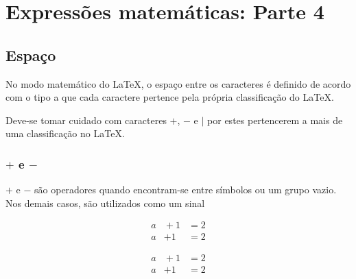 % 
% 
% 
% 
% 
\chapter{Expressões matemáticas: Parte 4} \label{sch:latex:math4}
\section{Espaço}
No modo matemático do LaTeX, o espaço entre os caracteres é definido de acordo com o tipo a que cada caractere pertence pela própria classificação do LaTeX.

Deve-se tomar cuidado com caracteres $+$, $-$ e $|$ por estes pertencerem a mais de uma classificação no LaTeX.

\subsection{$+$ e $-$}
$+$ e $-$ são operadores quando encontram-se entre símbolos ou um grupo vazio. Nos demais casos, são utilizados como um sinal \\
\begin{minipage}[t]{0.47\linewidth} \vspace{-8pt}
    \begin{latexcode}
        \begin{align*}
            a &{}+{} 1 &= 2 \\
            a &+ 1 &= 2
        \end{align*}
    \end{latexcode}
\end{minipage} \hfill
\begin{minipage}[t]{0.47\linewidth}
    \vspace{0pt}
    \begin{align*}
        a &{}+{} 1 &= 2 \\
        a &+ 1 &= 2
    \end{align*}
\end{minipage}

